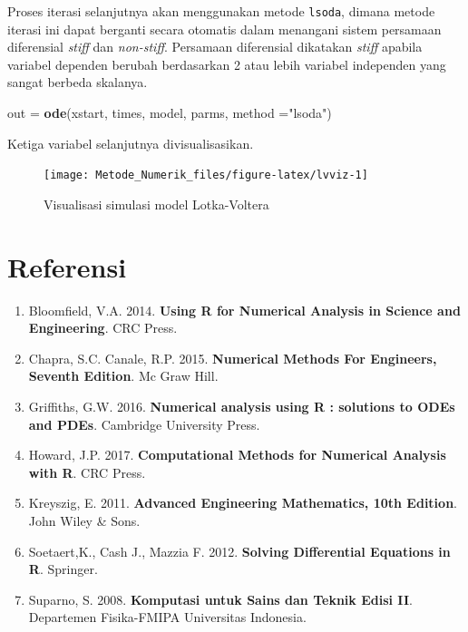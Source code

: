 \documentclass[
]{book}
\newenvironment{Shaded}{\begin{snugshade}}{\end{snugshade}}
\newcommand{\AttributeTok}[1]{\textcolor[rgb]{0.13,0.29,0.53}{#1}}
\newcommand{\FunctionTok}[1]{\textcolor[rgb]{0.13,0.29,0.53}{\textbf{#1}}}
\newcommand{\NormalTok}[1]{#1}
\newcommand{\OtherTok}[1]{\textcolor[rgb]{0.56,0.35,0.01}{#1}}
\newcommand{\StringTok}[1]{\textcolor[rgb]{0.31,0.60,0.02}{#1}}
\providecommand{\tightlist}{%
  \setlength{\itemsep}{0pt}\setlength{\parskip}{0pt}}
\theoremstyle{definition}
\theoremstyle{definition}
\theoremstyle{definition}
\theoremstyle{definition}
\theoremstyle{remark}
\begin{document}
Proses iterasi selanjutnya akan menggunakan metode \texttt{lsoda}, dimana metode iterasi ini dapat berganti secara otomatis dalam menangani sistem persamaan diferensial \emph{stiff} dan \emph{non-stiff}. Persamaan diferensial dikatakan \emph{stiff} apabila variabel dependen berubah berdasarkan 2 atau lebih variabel independen yang sangat berbeda skalanya.

\begin{Shaded}
\begin{Highlighting}[]
\NormalTok{out }\OtherTok{=} \FunctionTok{ode}\NormalTok{(xstart, times, model, parms, }
          \AttributeTok{method =}\StringTok{"lsoda"}\NormalTok{)}
\end{Highlighting}
\end{Shaded}

Ketiga variabel selanjutnya divisualisasikan.

\begin{figure}

{\centering \texttt{[image: Metode\_Numerik\_files/figure-latex/lvviz-1]} 

}

\caption{Visualisasi simulasi model Lotka-Voltera}\label{fig:lvviz}
\end{figure}

\hypertarget{referensi-5}{%
\section{Referensi}\label{referensi-5}}

\begin{enumerate}
\def\labelenumi{\arabic{enumi}.}
\tightlist
\item
  Bloomfield, V.A. 2014. \textbf{Using R for Numerical Analysis in Science and Engineering}. CRC Press.
\item
  Chapra, S.C. Canale, R.P. 2015. \textbf{Numerical Methods For Engineers, Seventh Edition}. Mc Graw Hill.
\item
  Griffiths, G.W. 2016. \textbf{Numerical analysis using R : solutions to ODEs and PDEs}. Cambridge University Press.
\item
  Howard, J.P. 2017. \textbf{Computational Methods for Numerical Analysis with R}. CRC Press.
\item
  Kreyszig, E. 2011. \textbf{Advanced Engineering Mathematics, 10th Edition}. John Wiley \& Sons.
\item
  Soetaert,K., Cash J., Mazzia F. 2012. \textbf{Solving Differential Equations in R}. Springer.
\item
  Suparno, S. 2008. \textbf{Komputasi untuk Sains dan Teknik Edisi II}. Departemen Fisika-FMIPA Universitas Indonesia.
\end{enumerate}
\end{document}

